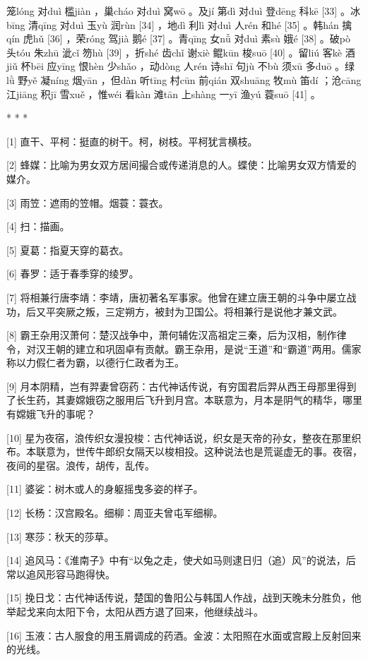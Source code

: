 \documentclass[12pt,UTF8]{ctexbook}
\begin{document}
笼lóng 对duì 槛jiàn ，巢cháo 对duì 窝wō 。及jí 第dì 对duì 登dēng 科kē [33] 。冰bīng 清qīng 对duì 玉yù 润rùn [34] ，地dì 利lì 对duì 人rén 和hé [35] 。韩hán 擒qín 虎hǔ [36] ，荣róng 驾jià 鹅é [37] 。青qīng 女nǚ 对duì 素sù 娥é [38] 。破pò 头tóu 朱zhū 泚cǐ 笏hù [39] ，折shé 齿chǐ 谢xiè 鲲kūn 梭suō [40] 。留liú 客kè 酒jiǔ 杯bēi 应yīng 恨hèn 少shǎo ，动dòng 人rén 诗shī 句jù 不bù 须xū 多duō 。绿lǜ 野yě 凝níng 烟yān ，但dàn 听tīng 村cūn 前qián 双shuāng 牧mù 笛dí ；沧cāng 江jiāng 积jī 雪xuě ，惟wéi 看kàn 滩tān 上shàng 一yī 渔yú 蓑suō [41] 。



* * *



[1] 直干、平柯：挺直的树干。柯，树枝。平柯犹言横枝。

[2] 蜂媒：比喻为男女双方居间撮合或传递消息的人。蝶使：比喻男女双方情爱的媒介。

[3] 雨笠：遮雨的笠帽。烟蓑：蓑衣。

[4] 扫：描画。

[5] 夏葛：指夏天穿的葛衣。

[6] 春罗：适于春季穿的绫罗。

[7] 将相兼行唐李靖：李靖，唐初著名军事家。他曾在建立唐王朝的斗争中屡立战功，后又平突厥之叛，三定朔方，被封为卫国公。将相兼行是说他才兼文武。

[8] 霸王杂用汉萧何：楚汉战争中，萧何辅佐汉高祖定三秦，后为汉相，制作律令，对汉王朝的建立和巩固卓有贡献。霸王杂用，是说“王道”和“霸道”两用。儒家称以力假仁者为霸，以德行仁政者为王。

[9] 月本阴精，岂有羿妻曾窃药：古代神话传说，有穷国君后羿从西王母那里得到了长生药，其妻嫦娥窃之服用后飞升到月宫。本联意为，月本是阴气的精华，哪里有嫦娥飞升的事呢？

[10] 星为夜宿，浪传织女漫投梭：古代神话说，织女是天帝的孙女，整夜在那里织布。本联意为，世传牛郎织女隔天以梭相投。这种说法也是荒诞虚无的事。夜宿，夜间的星宿。浪传，胡传，乱传。

[11] 婆娑：树木或人的身躯摇曳多姿的样子。

[12] 长杨：汉宫殿名。细柳：周亚夫曾屯军细柳。

[13] 寒莎：秋天的莎草。

[14] 追风马：《淮南子》中有“以兔之走，使犬如马则逮日归（追）风”的说法，后常以追风形容马跑得快。

[15] 挽日戈：古代神话传说，楚国的鲁阳公与韩国人作战，战到天晚未分胜负，他举起戈来向太阳下令，太阳从西方退了回来，他继续战斗。

[16] 玉液：古人服食的用玉屑调成的药酒。金波：太阳照在水面或宫殿上反射回来的光线。
\end{document}

